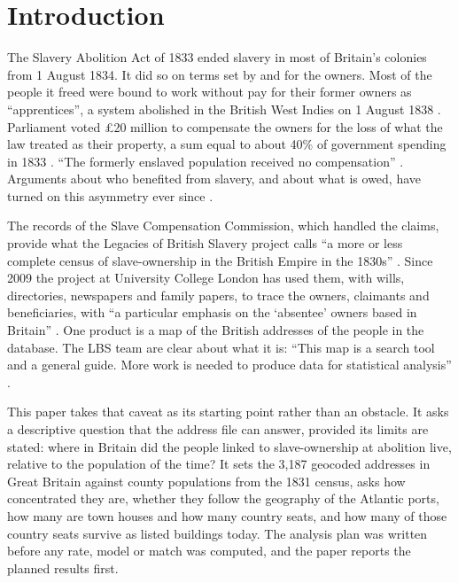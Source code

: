\documentclass[11pt,a4paper]{article}
\begin{document}
\section{Introduction}\label{sec:intro}
The Slavery Abolition Act of 1833 ended slavery in most of Britain's colonies from 1 August 1834. It did so on terms set by and for the owners. Most of the people it freed were bound to work without pay for their former owners as ``apprentices'', a system abolished in the British West Indies on 1 August 1838 \citep{baker2024,holt1992}. Parliament voted \pounds 20 million to compensate the owners for the loss of what the law treated as their property, a sum equal to about 40\% of government spending in 1833 \citep{baker2024}. ``The formerly enslaved population received no compensation'' \citep{baker2024}. Arguments about who benefited from slavery, and about what is owed, have turned on this asymmetry ever since \citep{williams1944,beckles2013}.

The records of the Slave Compensation Commission, which handled the claims, provide what the Legacies of British Slavery project calls ``a more or less complete census of slave-ownership in the British Empire in the 1830s'' \citep{lbs2026details}. Since 2009 the project at University College London has used them, with wills, directories, newspapers and family papers, to trace the owners, claimants and beneficiaries, with ``a particular emphasis on the `absentee' owners based in Britain'' \citep{lbs2026details,draper2010,hall2014}. One product is a map of the British addresses of the people in the database. The LBS team are clear about what it is: ``This map is a search tool and a general guide. More work is needed to produce data for statistical analysis'' \citep{lbs2026maps}.

This paper takes that caveat as its starting point rather than an obstacle. It asks a descriptive question that the address file can answer, provided its limits are stated: where in Britain did the people linked to slave-ownership at abolition live, relative to the population of the time? It sets the 3,187 geocoded addresses in Great Britain against county populations from the 1831 census, asks how concentrated they are, whether they follow the geography of the Atlantic ports, how many are town houses and how many country seats, and how many of those country seats survive as listed buildings today. The analysis plan was written before any rate, model or match was computed, and the paper reports the planned results first.
\end{document}
